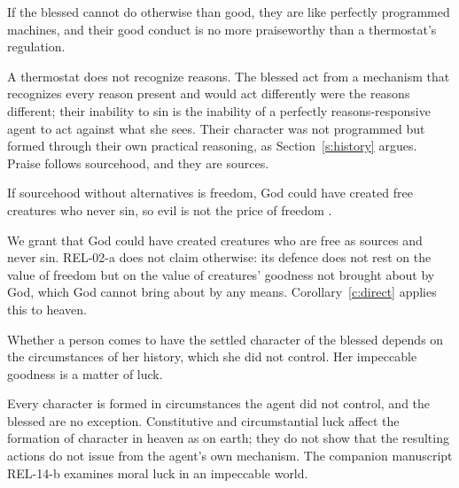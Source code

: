 \documentclass{situationist-preprint}
\begin{document}
\begin{objection}
If the blessed cannot do otherwise than good, they are like perfectly programmed machines, and their good conduct is no more praiseworthy than a thermostat's regulation.
\end{objection}

\begin{reply}
A thermostat does not recognize reasons. The blessed act from a mechanism that recognizes every reason present and would act differently were the reasons different; their inability to sin is the inability of a perfectly reasons-responsive agent to act against what she sees. Their character was not programmed but formed through their own practical reasoning, as Section~\ref{s:history} argues. Praise follows sourcehood, and they are sources.
\end{reply}

\begin{objection}
If sourcehood without alternatives is freedom, God could have created free creatures who never sin, so evil is not the price of freedom \citep{Sennett1999}.
\end{objection}

\begin{reply}
We grant that God could have created creatures who are free as sources and never sin. REL-02-a does not claim otherwise: its defence does not rest on the value of freedom but on the value of creatures' goodness not brought about by God, which God cannot bring about by any means. Corollary~\ref{c:direct} applies this to heaven.
\end{reply}

\begin{objection}[Luck]
Whether a person comes to have the settled character of the blessed depends on the circumstances of her history, which she did not control. Her impeccable goodness is a matter of luck.
\end{objection}

\begin{reply}
Every character is formed in circumstances the agent did not control, and the blessed are no exception. Constitutive and circumstantial luck affect the formation of character in heaven as on earth; they do not show that the resulting actions do not issue from the agent's own mechanism. The companion manuscript REL-14-b examines moral luck in an impeccable world.
\end{reply}
\end{document}
